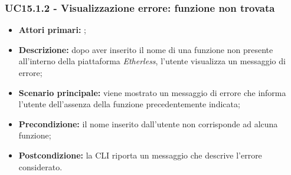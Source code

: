 \subsubsection{UC15.1.2 - Visualizzazione errore: funzione non trovata}
\begin{itemize}
	\item \textbf{Attori primari:} \us{};
	\item \textbf{Descrizione:} dopo aver inserito il nome di una funzione non presente all’interno della piattaforma \textit{Etherless}, l’utente visualizza un messaggio di errore; 
	\item \textbf{Scenario principale:} viene mostrato un messaggio di errore che informa l’utente dell’assenza della funzione precedentemente indicata;  
	\item \textbf{Precondizione:} il nome inserito dall’utente non corrisponde ad alcuna funzione;
	\item \textbf{Postcondizione:} la CLI riporta un messaggio che descrive l’errore considerato. 
\end{itemize}